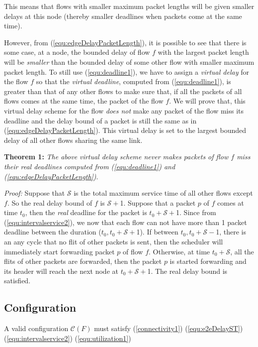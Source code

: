 \documentclass[conference, twocolumn]{IEEEtran}
\theoremstyle{definition}
\begin{document}
This means that flows with smaller maximum packet lengths will be given smaller
delays at this node (thereby smaller deadlines when packets come at the same
time).

However, from (\ref{equ:edgeDelayPacketLength}), it is possible to see that
there is some case, at a node, the bounded delay of flow $f$ with the largest packet length
will be {\em smaller} than the bounded delay of some other flow with smaller
maximum packet length. To still use (\ref{equ:deadline1}), we have to assign a
{\em virtual delay} for the flow $f$ so that the {\em virtual deadline},
computed from (\ref{equ:deadline1}), is greater than that of any other flows to
make sure that, if all the packets of all flows comes at the same time, the
packet of the flow $f$. We will prove that, this virtual delay scheme for the
flow {\em does not} make any packet of the flow miss its deadline and the delay
bound of a packet is still the same as in (\ref{equ:edgeDelayPacketLength}).
This virtual delay is set to the largest bounded delay of all other flows
sharing the same link.

{\textbf{Theorem 1:}} {\em  The above virtual delay scheme never makes
packets of flow $f$ miss their real deadlines computed from
(\ref{equ:deadline1}) and (\ref{equ:edgeDelayPacketLength})}.

{\em Proof:} Suppose that $\mathcal{S}$ is the total maximum service time of all
other flows except $f$. So the real delay bound of $f$ is $\mathcal{S}+$1.
Suppose that a packet $p$ of $f$ comes at time $t_0$, then the {\em real}
deadline for the packet is $t_0+\mathcal{S}+$1. Since from
(\ref{equ:intervalservice2}), we now that each flow can not have more than 1
packet deadline between the duration ($t_0, t_0+\mathcal{S}+$1). If between
$t_0, t_0+\mathcal{S} -$1, there is an any cycle that no flit of other packets is
sent, then the scheduler will immediately start forwarding packet $p$ of flow $f$.
Otherwise, at time $t_0+\mathcal{S}$, all the flits of other packets are
forwarded, then the packet $p$ is started forwarding and its header will reach
the next node at $t_0+\mathcal{S}+$1. The real delay bound is satisfied.

\subsection{Configuration}
A valid configuration $\mathcal{C}(F)$ must satisfy (\ref{connectivity1}) 
(\ref{equ:e2eDelayST}) (\ref{equ:intervalservice2}) (\ref{equ:utilization1})
\end{document}
